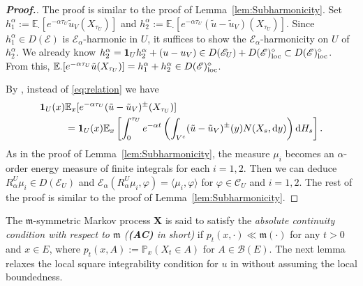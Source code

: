 \documentclass[12pt,a4paper]{article}
\renewcommand{\P}{\mathbb{P}}
\renewcommand{\d}{\mathrm{d}}
\newcommand{\m}{\mathfrak{m} }
\newcommand{\loc}{{\rm loc}}
\newcommand{\1}{{\bf 1}}
\begin{document}
\begin{proof}[{\bf Proof.}]
The proof is similar to the proof of Lemma~\ref{lem:Subharmonicity}.
Set $h_1^{\alpha}:=\mathbb{E}_{\cdot}[e^{-\alpha\tau_U}\tilde{u}_V(X_{\tau_U})]$ and $h_2^{\alpha}:=\mathbb{E}_{\cdot}[e^{-\alpha\tau_U}(\tilde{u}-\tilde{u}_V)(X_{\tau_U})]$. Since $h_1^{\alpha}\in D(\mathscr{E})$ is $\mathscr{E}_{\alpha}$-harmonic in $U$, it suffices to show the 
$\mathscr{E}_{\alpha}$-harmonicity on $U$ of $h_2^{\alpha}$. We already know $h_2^{\alpha}
=\1_Uh_2^{\alpha}+(u-u_V)\in D(\mathscr{E}_U)+D(\mathscr{E})^{\diamond}_{\loc}\subset D(\mathscr{E})^{\diamond}_{\loc}$. 
From this,  
$\mathbb{E}_{\cdot}[e^{-\alpha\tau_U}\tilde{u}(X_{\tau_U})]=h_1^{\alpha}+h_2^{\alpha}\in D(\mathscr{E})_{\loc}^{\diamond}$.
 
By \cite[(A.3.33)]{CFbook}, instead of \eqref{eq:relation} we have  
\begin{align}
\1_U(x)&\mathbb{E}_x[e^{-\alpha\tau_U}(\tilde{u}-\tilde{u}_V)^{\pm}(X_{\tau_U})]\notag\\&=\1_U(x)\mathbb{E}_x\left[\int_0^{\tau_U}e^{-\alpha t}\left(\int_{V^c}(\tilde{u}-\tilde{u}_V)^{\pm}(y)N(X_s,{\d} y)\right){\d} H_s \right].\label{eq:relation2}
\end{align}
As in the proof of Lemma~\ref{lem:Subharmonicity}, the measure $\mu_i$ becomes an $\alpha$-order energy measure of finite integrals for each $i=1,2$. Then we can deduce $R_{\alpha}^U\mu_i\in D(\mathscr{E}_U)$ and 
$\mathscr{E}_{\alpha}(R_{\alpha}^U\mu_i,\varphi)=\langle \mu_i,\varphi\rangle$ 
for $\varphi\in\mathscr{C}_U$ and $i=1,2$. The rest of the proof is similar to the proof of Lemma~\ref{lem:Subharmonicity}. 
\end{proof}
The ${\m}$-symmetric Markov process {\bf X} is said to satisfy the \emph{absolute continuity condition with respect to ${\m}$
{\rm(}{\bf (AC)} in short{\rm)}} if $p_t(x,\cdot)\ll{\m}(\cdot)$ for any $t>0$ and $x\in E$, where $p_t(x,A):=\P_x(X_t\in A)$ for $A\in\mathscr{B}(E)$.  
The next lemma relaxes the local square integrability condition for $u$ in 
\cite[Lemma~3.9]{CK} without assuming the local boundedness.
\end{document}
